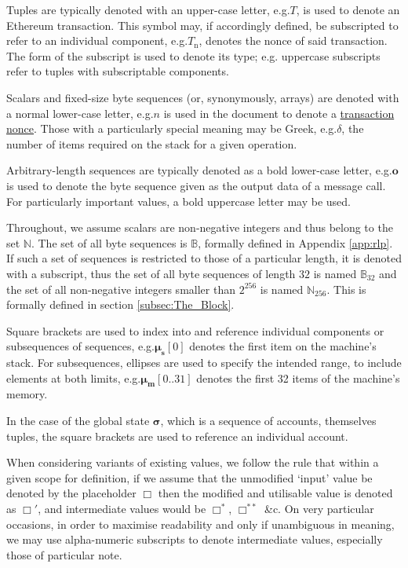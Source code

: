 \documentclass[9pt,oneside]{amsart}
\makeatletter
\newcommand*\eg{e.g.\@\xspace}
\makeatother
\begin{document}
\begin{multicols}{2}
Tuples are typically denoted with an upper-case letter, \eg $T$, is used to denote an Ethereum transaction. This symbol may, if accordingly defined, be subscripted to refer to an individual component, \eg \hyperlink{transaction_nonce}{$T_{\mathrm{n}}$}, denotes the nonce of said transaction. The form of the subscript is used to denote its type; \eg uppercase subscripts refer to tuples with subscriptable components.

Scalars and fixed-size byte sequences (or, synonymously, arrays) are denoted with a normal lower-case letter, \eg $n$ is used in the document to denote a \hyperlink{transaction_nonce}{transaction nonce}. Those with a particularly special meaning may be Greek, \eg $\delta$, the number of items required on the stack for a given operation.

Arbitrary-length sequences are typically denoted as a bold lower-case letter, \eg $\mathbf{o}$ is used to denote the byte sequence given as the output data of a message call. For particularly important values, a bold uppercase letter may be used.

Throughout, we assume scalars are non-negative integers and thus belong to the set $\mathbb{N}$. The set of all byte sequences is $\mathbb{B}$, formally defined in Appendix \ref{app:rlp}. If such a set of sequences is restricted to those of a particular length, it is denoted with a subscript, thus the set of all byte sequences of length $32$ is named $\mathbb{B}_{32}$ and the set of all non-negative integers smaller than $2^{256}$ is named $\mathbb{N}_{256}$. This is formally defined in section \hyperlink{block}{\ref{subsec:The_Block}}.

Square brackets are used to index into and reference individual components or subsequences of sequences, \eg $\boldsymbol{\mu}_{\mathbf{s}}[0]$ denotes the first item on the machine's stack. For subsequences, ellipses are used to specify the intended range, to include elements at both limits, \eg $\boldsymbol{\mu}_{\mathbf{m}}[0..31]$ denotes the first 32 items of the machine's memory.

In the case of the global state $\boldsymbol{\sigma}$, which is a sequence of accounts, themselves tuples, the square brackets are used to reference an individual account.

When considering variants of existing values, we follow the rule that within a given scope for definition, if we assume that the unmodified `input' value be denoted by the placeholder $\Box$ then the modified and utilisable value is denoted as $\Box'$, and intermediate values would be $\Box^*$,  $\Box^{**}$ \&c. On very particular occasions, in order to maximise readability and only if unambiguous in meaning, we may use alpha-numeric subscripts to denote intermediate values, especially those of particular note.


\end{multicols}
\end{document}
